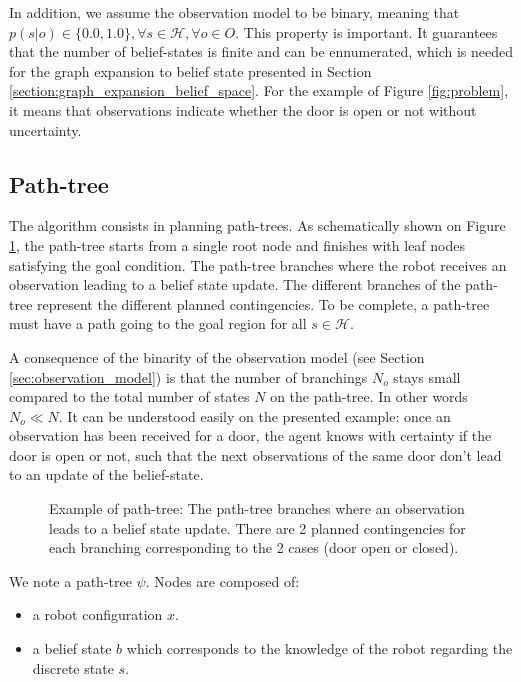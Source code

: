 \documentclass[letterpaper, 10 pt, conference]{ieeeconf}  %
\begin{document}
In addition, we assume the observation model to be binary, meaning that $p(s | o) \in \{0.0, 1.0\}, \forall s \in \mathcal{H}, \forall o \in O$. This property is important. It guarantees that the number of belief-states is finite and can be ennumerated, which is needed for the graph expansion to belief state presented in Section \ref{section:graph_expansion_belief_space}. For the example of Figure \ref{fig:problem}, it means that observations indicate whether the door is open or not without uncertainty.

\subsection{Path-tree}
The algorithm consists in planning path-trees. As schematically shown on Figure \ref{fig:path_tree}, the path-tree starts from a single root node and finishes with leaf nodes satisfying the goal condition. The path-tree branches where the robot receives an observation leading to a belief state update. The different branches of the path-tree represent the different planned contingencies. To be complete, a path-tree must have a path going to the goal region for all $s \in \mathcal{H}$.

A consequence of the binarity of the observation model (see Section \ref{sec:observation_model}) is that the number of branchings $N_o$ stays small compared to the total number of states $N$ on the path-tree. In other words $N_o \ll N$. It can be understood easily on the presented example: once an observation has been received for a door, the agent knows with certainty if the door is open or not, such that the next observations of the same door don't lead to an update of the belief-state.

\begin{figure}[!htb]
 \caption{Example of path-tree: The path-tree branches where an observation leads to a belief state update. There are 2 planned contingencies for each branching corresponding to the 2 cases (door open or closed).}
 \label{fig:path_tree}
\end{figure}

We note a path-tree $\psi$. Nodes are composed of:
\begin{itemize}
\item a robot configuration $x$.
\item a belief state $b$ which corresponds to the knowledge of the robot regarding the discrete state $s$.
\end{itemize}
\end{document}

